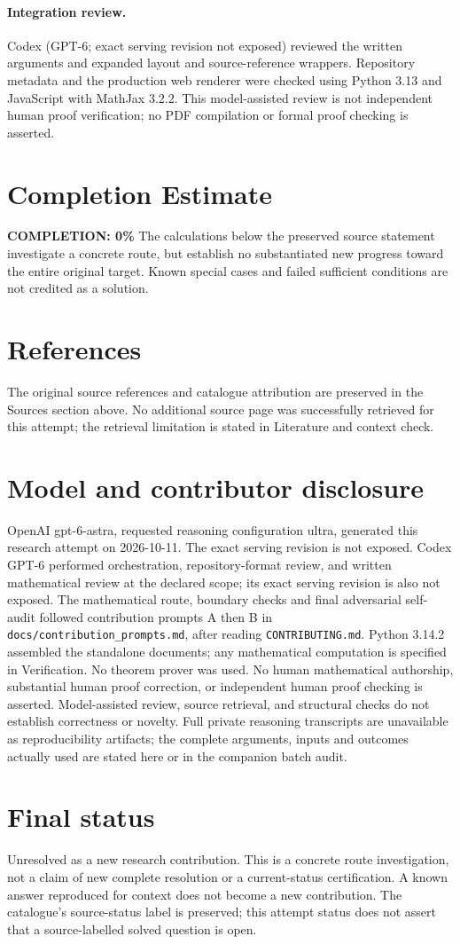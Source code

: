 \documentclass[11pt]{article}
\begin{document}
\paragraph{Integration review.} Codex (GPT-6; exact serving revision not exposed) reviewed the written arguments and expanded layout and source-reference wrappers. Repository metadata and the production web renderer were checked using Python 3.13 and JavaScript with MathJax 3.2.2. This model-assisted review is not independent human proof verification; no PDF compilation or formal proof checking is asserted.

\section{Completion Estimate}
\noindent\textbf{COMPLETION: 0\%}
The calculations below the preserved source statement investigate a concrete route,
but establish no substantiated new progress toward the entire original target.
Known special cases and failed sufficient conditions are not credited as a solution.
\section{References}
The original source references and catalogue attribution are preserved in the
Sources section above. No additional source page was successfully retrieved for
this attempt; the retrieval limitation is stated in Literature and context check.
\section{Model and contributor disclosure}
OpenAI gpt-6-astra, requested reasoning configuration ultra, generated this research
attempt on 2026-10-11. The exact serving revision is not exposed. Codex GPT-6
performed orchestration, repository-format review, and written mathematical review at the declared scope; its exact serving revision
is also not exposed. The mathematical route, boundary checks and final adversarial
self-audit followed contribution prompts A then B in
\texttt{docs/contribution\_prompts.md}, after reading \texttt{CONTRIBUTING.md}.
Python 3.14.2 assembled the standalone documents; any mathematical computation is
specified in Verification. No theorem prover was used. No human mathematical
authorship, substantial human proof correction, or independent human proof checking
is asserted. Model-assisted review, source retrieval, and structural checks do not
establish correctness or novelty. Full private reasoning transcripts are unavailable
as reproducibility artifacts; the complete arguments, inputs and outcomes actually
used are stated here or in the companion batch audit.
\section{Final status}
Unresolved as a new research contribution. This is a concrete route investigation,
not a claim of new complete resolution or a current-status certification. A known
answer reproduced for context does not become a new contribution. The catalogue's
source-status label is preserved; this attempt status does not assert that a
source-labelled solved question is open.
\end{document}
